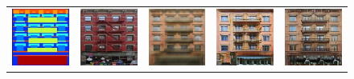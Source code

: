 \begin{figure}[t]
\begin{center}
\begin{tabular}{ccccc}
\includegraphics[width=0.2\linewidth]{figs/facades2_loss_variations_latex/input_46.jpg} &
\includegraphics[width=0.2\linewidth]{figs/facades2_loss_variations_latex/gt_46.jpg} &
\includegraphics[width=0.2\linewidth]{figs/facades2_loss_variations_latex/L1_46.jpg} &
\includegraphics[width=0.2\linewidth]{figs/facades2_loss_variations_latex/cGAN_46.jpg} &
\includegraphics[width=0.2\linewidth]{figs/facades2_loss_variations_latex/L1cGAN_46.jpg} \\ 


\end{tabular}
\end{center}
\end{figure}
